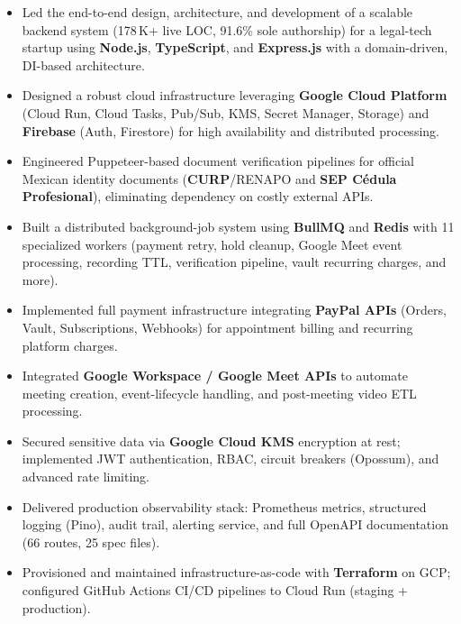 \documentclass[11pt, letterpaper]{article}
\newenvironment{cvlist}{%
  \begin{itemize}[
    leftmargin=1.4em,
    itemsep=1.5pt,
    topsep=3pt,
    parsep=0pt
  ]
}{%
  \end{itemize}%
}
\begin{document}
\begin{cvlist}
  \item Led the end-to-end design, architecture, and development of a
        scalable backend system (178\,K+ live LOC, 91.6\% sole authorship)
        for a legal-tech startup using \textbf{Node.js}, \textbf{TypeScript},
        and \textbf{Express.js} with a domain-driven, DI-based architecture.

  \item Designed a robust cloud infrastructure leveraging
        \textbf{Google Cloud Platform} (Cloud Run, Cloud Tasks, Pub/Sub,
        KMS, Secret Manager, Storage) and \textbf{Firebase}
        (Auth, Firestore) for high availability and distributed processing.

  \item Engineered Puppeteer-based document verification pipelines for
        official Mexican identity documents (\textbf{CURP}/RENAPO and
        \textbf{SEP C\'edula Profesional}), eliminating dependency on
        costly external APIs.

  \item Built a distributed background-job system using \textbf{BullMQ}
        and \textbf{Redis} with 11 specialized workers (payment retry,
        hold cleanup, Google Meet event processing, recording TTL,
        verification pipeline, vault recurring charges, and more).

  \item Implemented full payment infrastructure integrating
        \textbf{PayPal APIs} (Orders, Vault, Subscriptions, Webhooks)
        for appointment billing and recurring platform charges.

  \item Integrated \textbf{Google Workspace / Google Meet APIs} to
        automate meeting creation, event-lifecycle handling, and
        post-meeting video ETL processing.

  \item Secured sensitive data via \textbf{Google Cloud KMS}
        encryption at rest; implemented JWT authentication, RBAC,
        circuit breakers (Opossum), and advanced rate limiting.

  \item Delivered production observability stack: Prometheus metrics,
        structured logging (Pino), audit trail, alerting service, and
        full OpenAPI documentation (66 routes, 25 spec files).

  \item Provisioned and maintained infrastructure-as-code with
        \textbf{Terraform} on GCP; configured GitHub Actions CI/CD
        pipelines to Cloud Run (staging + production).
\end{cvlist}
\end{document}
